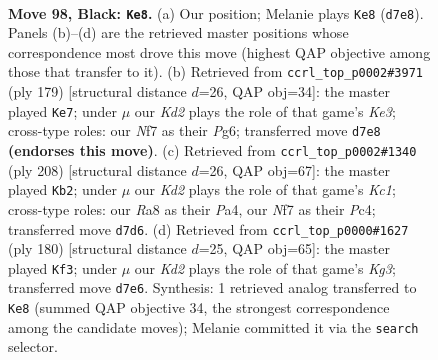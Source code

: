 \documentclass[11pt]{article}
\begin{document}
\clearpage

\begin{figure}[p]\centering
\begin{subfigure}{0.46\textwidth}\centering
\resizebox{\linewidth}{!}{%
\newchessgame
\chessboard[
  setfen={r7/1R1k1n2/P7/6P1/4K3/7P/2P1B3/8 b - - 4 98},
  showmover=false,
  pgfstyle=straightmove, color=movearrow, markmove={d7-e8}
]}
\caption{}
\end{subfigure}\hfill
\begin{subfigure}{0.46\textwidth}\centering
\resizebox{\linewidth}{!}{%
\newchessgame
\chessboard[
  setfen={8/8/R3k1p1/6P1/3r3P/5K2/8/8 b - - 2 90},
  showmover=false,
  pgfstyle=straightmove, color=movearrow, markmove={e6-e7}
]}
\caption{}
\end{subfigure}
\\[4pt]
\begin{subfigure}{0.46\textwidth}\centering
\resizebox{\linewidth}{!}{%
\newchessgame
\chessboard[
  setfen={8/3N3k/8/2p5/PpP1P3/2r5/8/2K5 w - - 2 105},
  showmover=false,
  pgfstyle=straightmove, color=movearrow, markmove={c1-b2}
]}
\caption{}
\end{subfigure}\hfill
\begin{subfigure}{0.46\textwidth}\centering
\resizebox{\linewidth}{!}{%
\newchessgame
\chessboard[
  setfen={8/8/8/6rp/3k4/p5K1/N7/7R w - - 6 91},
  showmover=false,
  pgfstyle=straightmove, color=movearrow, markmove={g3-f3}
]}
\caption{}
\end{subfigure}
\caption{\textbf{Move 98, Black: \texttt{Ke8}.} (a) Our position; Melanie plays \texttt{Ke8} (\texttt{d7e8}). Panels (b)--(d) are the retrieved master positions whose correspondence most drove this move (highest QAP objective among those that transfer to it). (b) Retrieved from \texttt{ccrl\_top\_p0002\#3971} (ply 179) [structural distance $d$=26, QAP obj=34]: the master played \texttt{Ke7}; under $\mu$ our \emph{Kd2} plays the role of that game's \emph{Ke3}; cross-type roles: our \emph{N}f7 as their \emph{P}g6; transferred move \texttt{d7e8} \textbf{(endorses this move)}. (c) Retrieved from \texttt{ccrl\_top\_p0002\#1340} (ply 208) [structural distance $d$=26, QAP obj=67]: the master played \texttt{Kb2}; under $\mu$ our \emph{Kd2} plays the role of that game's \emph{Kc1}; cross-type roles: our \emph{R}a8 as their \emph{P}a4, our \emph{N}f7 as their \emph{P}c4; transferred move \texttt{d7d6}. (d) Retrieved from \texttt{ccrl\_top\_p0000\#1627} (ply 180) [structural distance $d$=25, QAP obj=65]: the master played \texttt{Kf3}; under $\mu$ our \emph{Kd2} plays the role of that game's \emph{Kg3}; transferred move \texttt{d7e6}. Synthesis: 1 retrieved analog transferred to \texttt{Ke8} (summed QAP objective 34, the strongest correspondence among the candidate moves); Melanie committed it via the \texttt{search} selector.}
\label{fig:thought-m195}
\end{figure}
\end{document}
